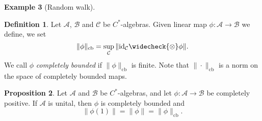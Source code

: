 \documentclass[10pt,a4paper]{amsart}
\theoremstyle{definition}
\newtheorem{definition}{Definition}[section]
\theoremstyle{definition}
\newtheorem{example}[definition]{Example}
\theoremstyle{definition}
\theoremstyle{definition}
\newtheorem{proposition}[definition]{Proposition}
\theoremstyle{definition}
\theoremstyle{definition}
\newtheorem{theorem}[definition]{Theorem}
\begin{document}
\begin{example}[Random walk]
  

\begin{definition} \cite[Introduction  p.4]{pisierTensorProductsCAlgebras2020} \label{def:cb_norm}
Let $\mathcal{A}$, $\mathcal{B}$ and $\mathcal{C}$ be $C^*$-algebras. Given  linear map $\phi: \mathcal{A} \to \mathcal{B}$ we define, we set
\[
\|\phi\|_{\text{cb}} = \sup_{\mathcal{C}} \|\id_{\mathcal{C}} \widecheck{\otimes} \phi\|.
\]
We call $\phi$ \emph{completely bounded} if $\|\phi\|_{\text{cb}} $ is finite.
Note that $\|\cdot\|_{\text{cb}}$ is a norm on the space of completely bounded maps. 

\end{definition}


\begin{proposition} \label{prop:cp_cb} \cite[Exercise 11.5 (iii)]{pisierIntroductionOperatorSpace2003}
  Let $\mathcal{A}$ and $\mathcal{B}$ be $C^*$-algebras, and let $\phi: \mathcal{A} \to \mathcal{B}$ be completely positive. If $\mathcal{A}$ is unital, then $\phi$ is completely bounded and 
\[
\|\phi(1)\| = \|\phi\| = \|\phi\|_{\text{cb}}.
\]
\end{proposition}

\begin{comment}
\begin{theorem} \label{thm:tensor_cb} \cite[Proposition 12.3]{paulsenCompletelyBoundedMaps2003}
  Let $\mathcal{A}_i$ and $\mathcal{B}_i$ be unital $C^*$-algebras, let $\mathcal{S}_i \subseteq \mathcal{A}_i$ be subspaces, 
and let $L_i: \mathcal{S}_i \to \mathcal{B}_i$ be completely bounded, $i = 1,2$. Then the linear map $L_1 \widecheck{\otimes} 
L_2: \mathcal{S}_1 \widecheck{\otimes} \mathcal{S}_2 \to \mathcal{B}_1 \widecheck{\otimes} \mathcal{B}_2$, given by $(L_1 \widecheck{\otimes} L_2)(a_1 \otimes a_2) = L_1(a_1) \otimes L_2(a_2)$, 
defines a completely bounded map $L_1 \widecheck{\otimes} L_2: \mathcal{S}_1 \widecheck{\otimes} \mathcal{S}_2 \to \mathcal{B}_1 \widecheck{\otimes} \mathcal{B}_2$, with
\[
\|L_1 \widecheck{\otimes}L_2\|_{\text{cb}} = \|L_1\|_{\text{cb}} \|L_2\|_{\text{cb}}.
\]
\end{theorem}


\begin{proposition} \cite[Proposition 3.2.2]{effrosOperatorSpaces2000} \label{prop:cb_dual}
  Given $C^*$-algebras $\mathcal{A}$ and $\mathcal{B}$, and a completely bounded mapping $\phi : A \to B$, we have
\[
\|\phi^*\|_{\text{cb}} =  \|\phi\|_{\text{cb}}.
\]
\end{proposition}




\end{comment}
\end{example}
\end{document}
